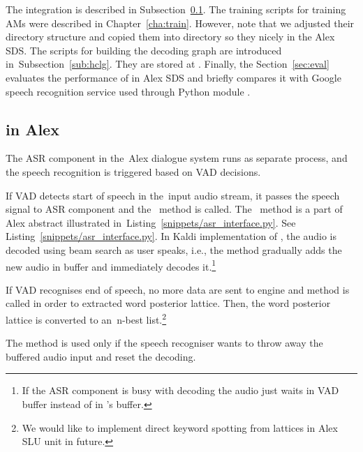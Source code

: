 The  integration is described in Subsection~\ref{sub:asr_component}.
The training scripts for training \acp{AM} were described in Chapter~\ref{cha:train}.
However, note that we adjusted their directory structure and copied them into  directory so they nicely in the Alex \ac{SDS}.
The scripts for building the  decoding graph are introduced in~Subsection~\ref{sub:hclg}.
They are stored at .
Finally, the Section~\ref{sec:eval} evaluates the performance of  in Alex \ac{SDS} and briefly compares it with Google speech recognition service used through Python module .

\subsection{ in Alex}
\label{sub:asr_component}
The \ac{ASR} component in the~Alex dialogue system runs as separate process, and the speech recognition is triggered based on \ac{VAD} decisions.

If \ac{VAD} detects start of speech in the~input audio stream, it passes the speech signal to \ac{ASR} component and the~ method is called. 
The~ method is a part of Alex abstract  illustrated in~Listing~\ref{snippets/asr_interface.py}.
See Listing~\ref{snippets/asr_interface.py}.
In Kaldi implementation of , the audio is decoded using beam search as user speaks, i.e., the method  gradually adds the new audio in  buffer and immediately decodes it.\footnote{If the \ac{ASR} component is busy with decoding the audio just waits in \ac{VAD} buffer instead of in 's buffer.}

If \ac{VAD} recognises end of speech, no more data are sent to  engine and  method is called in order to extracted word posterior lattice.
Then, the word posterior lattice is converted to an~n-best list.\footnote{We would like to implement direct keyword spotting from  lattices in Alex \ac{SLU} unit in future.}

The  method is used only if the speech recogniser wants to throw away the buffered audio input and reset the decoding.

